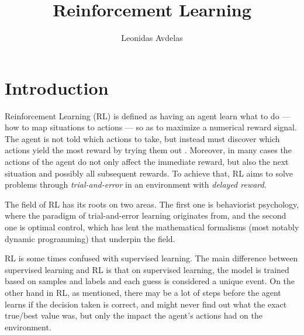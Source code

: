 \documentclass[11pt, a4paper]{article}
\title{Reinforcement Learning}
\author{Leonidas Avdelas}
\date{}
\begin{document}
\maketitle

\section{Introduction}
Reinforcement Learning (RL) is defined as having an agent learn what to do — how to map situations to actions — so
as to maximize a numerical reward signal. The agent is not told which actions to
take, but instead must discover which actions yield the most reward by trying them out \cite{rlbook}.
Moreover, in many cases the actions of the agent  do not only affect the immediate reward, but
also the next situation and possibly all subsequent rewards. To achieve that, RL
aims to solve problems through \textit{trial-and-error} in an environment with \textit{delayed reward}.

The field of RL has its roots on two areas. The first one is behaviorist psychology,
where the paradigm of trial-and-error learning originates from, and the second one is optimal control, which
has lent the mathematical formalisms (most notably dynamic programming) that underpin the field.

RL is some times confused with supervised learning. The main difference between supervised learning and
RL is that on supervised learning, the model is trained based on samples and labels and each guess is considered
a unique event. On the other hand in RL, as mentioned, there may be a lot of steps before the agent learns if the
decision taken is correct, and might never find out what the exact true/best value was, but only the impact the agent's
actions had on the environment.
\end{document}
